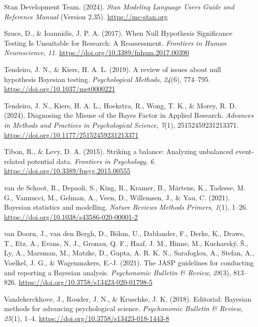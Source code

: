 \documentclass[
  doc,12pt,floatsintext]{apa7}
\newlength{\cslhangindent}
\newenvironment{CSLReferences}[2] %
 {\begin{list}{}{%
  \setlength{\itemindent}{0pt}
  \setlength{\leftmargin}{0pt}
  \setlength{\parsep}{0pt}
  \ifodd #1
   \setlength{\leftmargin}{\cslhangindent}
   \setlength{\itemindent}{-1\cslhangindent}
  \fi
  \setlength{\itemsep}{#2\baselineskip}}}
 {\end{list}}
\begin{document}
\begin{CSLReferences}{1}{0}
Stan Development Team. (2024). \emph{Stan {Modeling Language Users Guide} and {Reference Manual}} (Version 2.35). \url{https://mc-stan.org}

Szucs, D., \& Ioannidis, J. P. A. (2017). When {Null Hypothesis Significance Testing Is Unsuitable} for {Research}: {A Reassessment}. \emph{Frontiers in Human Neuroscience}, \emph{11}. \url{https://doi.org/10.3389/fnhum.2017.00390}

Tendeiro, J. N., \& Kiers, H. A. L. (2019). A review of issues about null hypothesis {Bayesian} testing. \emph{Psychological Methods}, \emph{24}(6), 774--795. \url{https://doi.org/10.1037/met0000221}

Tendeiro, J. N., Kiers, H. A. L., Hoekstra, R., Wong, T. K., \& Morey, R. D. (2024). Diagnosing the {Misuse} of the {Bayes Factor} in {Applied Research}. \emph{Advances in Methods and Practices in Psychological Science}, \emph{7}(1), 25152459231213371. \url{https://doi.org/10.1177/25152459231213371}

Tibon, R., \& Levy, D. A. (2015). Striking a balance: Analyzing unbalanced event-related potential data. \emph{Frontiers in Psychology}, \emph{6}. \url{https://doi.org/10.3389/fpsyg.2015.00555}

van de Schoot, R., Depaoli, S., King, R., Kramer, B., Märtens, K., Tadesse, M. G., Vannucci, M., Gelman, A., Veen, D., Willemsen, J., \& Yau, C. (2021). Bayesian statistics and modelling. \emph{Nature Reviews Methods Primers}, \emph{1}(1), 1--26. \url{https://doi.org/10.1038/s43586-020-00001-2}

van Doorn, J., van den Bergh, D., Böhm, U., Dablander, F., Derks, K., Draws, T., Etz, A., Evans, N. J., Gronau, Q. F., Haaf, J. M., Hinne, M., Kucharský, Š., Ly, A., Marsman, M., Matzke, D., Gupta, A. R. K. N., Sarafoglou, A., Stefan, A., Voelkel, J. G., \& Wagenmakers, E.-J. (2021). The {JASP} guidelines for conducting and reporting a {Bayesian} analysis. \emph{Psychonomic Bulletin \& Review}, \emph{28}(3), 813--826. \url{https://doi.org/10.3758/s13423-020-01798-5}

Vandekerckhove, J., Rouder, J. N., \& Kruschke, J. K. (2018). Editorial: {Bayesian} methods for advancing psychological science. \emph{Psychonomic Bulletin \& Review}, \emph{25}(1), 1--4. \url{https://doi.org/10.3758/s13423-018-1443-8}


\end{CSLReferences}
\end{document}
